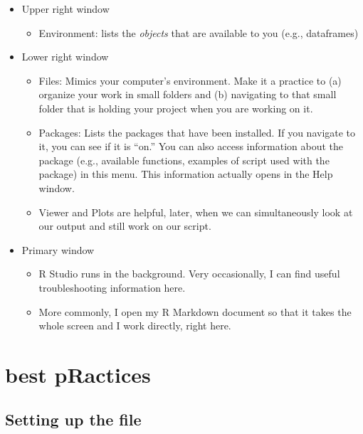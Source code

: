 \documentclass[
  english,
]{book}
\providecommand{\tightlist}{%
  \setlength{\itemsep}{0pt}\setlength{\parskip}{0pt}}
\begin{document}
\begin{itemize}
\tightlist
\item
  Upper right window

  \begin{itemize}
  \tightlist
  \item
    Environment: lists the \emph{objects} that are available to you (e.g., dataframes)
  \end{itemize}
\item
  Lower right window

  \begin{itemize}
  \tightlist
  \item
    Files: Mimics your computer's environment. Make it a practice to (a) organize your work in small folders and (b) navigating to that small folder that is holding your project when you are working on it.
  \item
    Packages: Lists the packages that have been installed. If you navigate to it, you can see if it is ``on.'' You can also access information about the package (e.g., available functions, examples of script used with the package) in this menu. This information actually opens in the Help window.
  \item
    Viewer and Plots are helpful, later, when we can simultaneously look at our output and still work on our script.
  \end{itemize}
\item
  Primary window

  \begin{itemize}
  \tightlist
  \item
    R Studio runs in the background. Very occasionally, I can find useful troubleshooting information here.
  \item
    More commonly, I open my R Markdown document so that it takes the whole screen and I work directly, right here.
  \end{itemize}
\end{itemize}

\hypertarget{best-practices}{%
\section{best pRactices}\label{best-practices}}

\hypertarget{setting-up-the-file}{%
\subsection{Setting up the file}\label{setting-up-the-file}}
\end{document}

